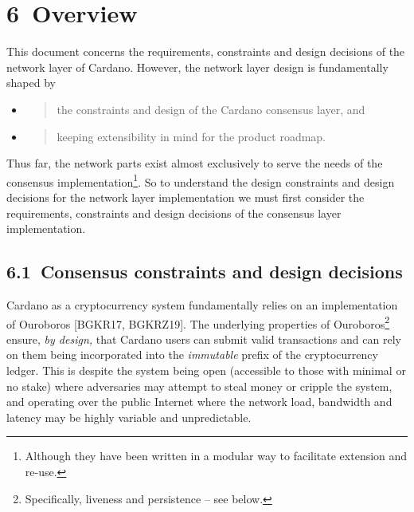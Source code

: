 \documentclass[11pt,a4paper]{article}
\begin{document}
\hypertarget{overview}{%
\section{​6​~Overview}\label{overview}}

This document concerns the requirements, constraints and design
decisions of the network layer of Cardano. However, the network layer
design is fundamentally shaped by

\begin{itemize}
\item
  \begin{quote}
  the constraints and design of the Cardano consensus layer, and
  \end{quote}
\item
  \begin{quote}
  keeping extensibility in mind for the product roadmap.
  \end{quote}
\end{itemize}

Thus far, the network parts exist almost exclusively to serve the needs
of the consensus implementation\footnote{Although they have been written
  in a modular way to facilitate extension and re-use.}. So to
understand the design constraints and design decisions for the network
layer implementation we must first consider the requirements,
constraints and design decisions of the consensus layer implementation.

\hypertarget{consensus-constraints-and-design-decisions}{%
\subsection{​6.1​~Consensus constraints and design
decisions}\label{consensus-constraints-and-design-decisions}}

Cardano as a cryptocurrency system fundamentally relies on an
implementation of Ouroboros {[}BGKR17, BGKRZ19{]}. The underlying
properties of Ouroboros\footnote{Specifically, liveness and persistence
  -- see below.} ensure, \emph{by design,} that Cardano users can submit
valid transactions and can rely on them being incorporated into the
\emph{immutable} prefix of the cryptocurrency ledger. This is despite
the system being open (accessible to those with minimal or no stake)
where adversaries may attempt to steal money or cripple the system, and
operating over the public Internet where the network load, bandwidth and
latency may be highly variable and unpredictable.
\end{document}

